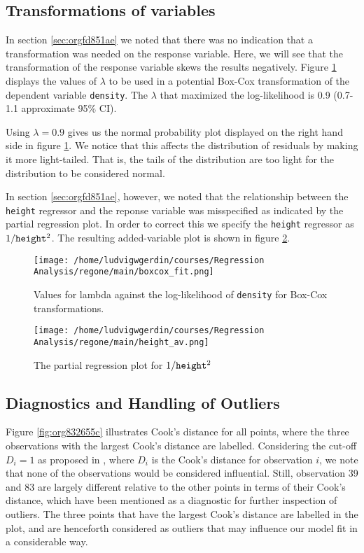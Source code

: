 \documentclass[11pt]{article}
\begin{document}
\subsection{Transformations of variables}
\label{sec:org2521265}

In section \ref{sec:orgfd851ae} we noted that there was no indication that a transformation was needed on the 
response variable. Here, we will see that the transformation of the response variable skews the results negatively.
Figure \ref{fig:orgb24a607} displays the values of \(\lambda\) to be used in a potential Box-Cox transformation of 
the dependent variable \texttt{density}. The \(\lambda\) that maximized the log-likelihood is 0.9 
(0.7-1.1 approximate 95\% CI). 

Using \(\lambda = 0.9\) gives us the normal probability plot displayed on the right hand side in figure
\ref{fig:orgb24a607}. We notice that this affects the distribution of residuals by making it more light-tailed. 
That is, the tails of the distribution are too light for the distribution to be considered normal.

In section \ref{sec:orgfd851ae}, however, we noted that the relationship between the \texttt{height} regressor 
and the reponse variable was misspecified as indicated by the partial regression plot. In order to correct 
this we specify the \texttt{height} regressor as \(1/\text{\texttt{height}}^2\). The resulting added-variable
plot is shown in figure \ref{fig:org3f44314}.

\begin{figure}[h]
\centering
\texttt{[image: /home/ludvigwgerdin/courses/Regression Analysis/regone/main/boxcox\_fit.png]}
\caption{\label{fig:orgb24a607}
Values for lambda against the log-likelihood of \texttt{density} for Box-Cox transformations.}
\end{figure}

\begin{figure}[h]
\centering
\texttt{[image: /home/ludvigwgerdin/courses/Regression Analysis/regone/main/height\_av.png]}
\caption{\label{fig:org3f44314}
The partial regression plot for \(1/\text{\texttt{height}}^2\)}
\end{figure}

\subsection{Diagnostics and Handling of Outliers}
\label{sec:org3b3885d}

Figure \ref{fig:org832655c} illustrates Cook's distance for all points, where the three observations with the largest 
Cook's distance are labelled. Considering the cut-off \(D_i = 1\) as proposed in \cite{Montgomery2012}, 
where \(D_i\) is the Cook's distance for observation \(i\), we note that none of the observations would be 
considered influential. Still, observation 39 and 83 are largely different relative
to the other points in terms of their Cook's distance, which have been mentioned as a diagnostic for further
inspection of outliers. \cite{Fox1991} The three points that have the largest Cook's distance are labelled
in the plot, and are henceforth considered as outliers that may influence our model fit in a considerable way.
\end{document}
